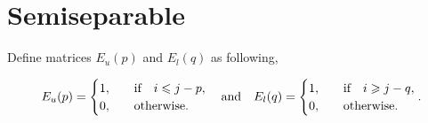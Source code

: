 \documentclass[11pt]{article}
\begin{document}
\newpage






\cite{Cooper13}

% 
% 

% 
% 










\section{Semiseparable}

Define matrices $E_{u}(p)$ and $E_{l}(q)$ as following,

\begin{align}
    E_{u}(p) = \begin{cases}
        1\qc &  \qif* i \leqslant j - p, \\ 
        0\qc &  \text{otherwise}.
    \end{cases}
    \qand
    E_{l}(q) = \begin{cases}
        1\qc &  \qif* i \geqslant j - q, \\ 
        0\qc &  \text{otherwise}.
    \end{cases}.
\end{align}
\end{document}
